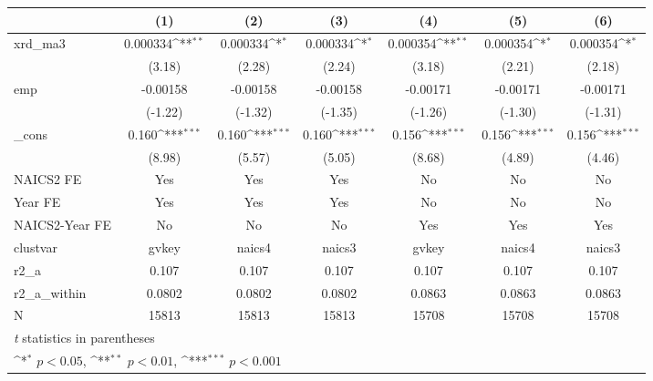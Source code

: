 {
\def\sym#1{\ifmmode^{#1}\else\(^{#1}\)\fi}
\begin{tabular}{l*{6}{c}}
\hline\hline
            &\multicolumn{1}{c}{(1)}         &\multicolumn{1}{c}{(2)}         &\multicolumn{1}{c}{(3)}         &\multicolumn{1}{c}{(4)}         &\multicolumn{1}{c}{(5)}         &\multicolumn{1}{c}{(6)}         \\
\hline
xrd\_ma3     &    0.000334\sym{**} &    0.000334\sym{*}  &    0.000334\sym{*}  &    0.000354\sym{**} &    0.000354\sym{*}  &    0.000354\sym{*}  \\
            &      (3.18)         &      (2.28)         &      (2.24)         &      (3.18)         &      (2.21)         &      (2.18)         \\
[1em]
emp         &    -0.00158         &    -0.00158         &    -0.00158         &    -0.00171         &    -0.00171         &    -0.00171         \\
            &     (-1.22)         &     (-1.32)         &     (-1.35)         &     (-1.26)         &     (-1.30)         &     (-1.31)         \\
[1em]
\_cons      &       0.160\sym{***}&       0.160\sym{***}&       0.160\sym{***}&       0.156\sym{***}&       0.156\sym{***}&       0.156\sym{***}\\
            &      (8.98)         &      (5.57)         &      (5.05)         &      (8.68)         &      (4.89)         &      (4.46)         \\
[1em]
NAICS2 FE   &         Yes         &         Yes         &         Yes         &          No         &          No         &          No         \\
[1em]
Year FE     &         Yes         &         Yes         &         Yes         &          No         &          No         &          No         \\
[1em]
NAICS2-Year FE&          No         &          No         &          No         &         Yes         &         Yes         &         Yes         \\
\hline
clustvar    &       gvkey         &      naics4         &      naics3         &       gvkey         &      naics4         &      naics3         \\
r2\_a        &       0.107         &       0.107         &       0.107         &       0.107         &       0.107         &       0.107         \\
r2\_a\_within &      0.0802         &      0.0802         &      0.0802         &      0.0863         &      0.0863         &      0.0863         \\
N           &       15813         &       15813         &       15813         &       15708         &       15708         &       15708         \\
\hline\hline
\multicolumn{7}{l}{\footnotesize \textit{t} statistics in parentheses}\\
\multicolumn{7}{l}{\footnotesize \sym{*} \(p<0.05\), \sym{**} \(p<0.01\), \sym{***} \(p<0.001\)}\\
\end{tabular}
}
